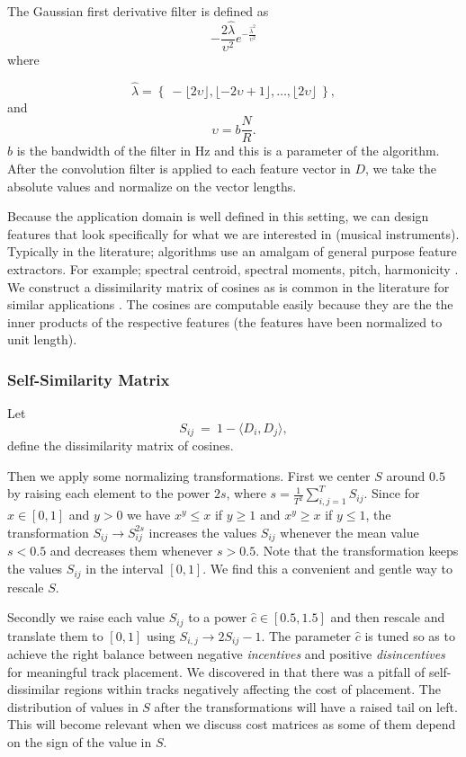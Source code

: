 \documentclass[twocolumn]{article}
\begin{document}
	The Gaussian first derivative filter is defined as 
	$$- \frac{2 \hat{\lambda}}{\upsilon^2}  e^{-\frac{\hat{\lambda}^2}{\upsilon^2}} $$ where 
	
	$$\hat{\lambda}=\left\{~-\lfloor 2\upsilon\rfloor,\lfloor-2\upsilon+1\rfloor,\ldots, \lfloor 2 \upsilon \rfloor~\right\},$$ and $$\upsilon = b  \frac{N}{R} .$$ $b$ is the bandwidth of the filter in Hz and this is a parameter of the algorithm. After the convolution filter is applied to each feature vector in $D$, we take the absolute values and normalize on the vector lengths.  
	
	Because the application domain is well defined in this setting, we can design features that look specifically for what we are interested in (musical instruments). Typically in the literature; algorithms use an amalgam of general purpose feature extractors. For example; spectral centroid, spectral moments, pitch, harmonicity \cite{tzanetakis1999framework}. We construct a dissimilarity matrix of cosines as is common in the literature for similar applications \cite{foote1999visualizing}. The cosines are computable easily because they are the the inner products of the respective features (the features have been normalized to unit length).
	
		\subsubsection{Self-Similarity Matrix}\label{sec:self-similarity}
	
	Let
	\[
	S_{ij} ~=~ 1-\langle D_{i}, D_{j}\rangle,
	\] define the dissimilarity matrix of cosines.
	
Then we apply some normalizing transformations. First we center $S$
around $0.5$ by raising each element to the power $2s$, where
$s=\frac{1}{T^2}\sum_{i,j=1}^TS_{ij}$. Since for $x\in [0,1]$ and
$y>0$ we have $x^y\le x$ if $y\ge 1$ and $x^y\ge x$ if $y\le 1$, the
transformation $S_{ij}\to S_{ij}^{2s}$ increases the values $S_{ij}$
whenever the mean value $s<0.5$ and decreases them whenever
$s>0.5$. Note that the transformation keeps the values $S_{ij}$ in the
interval $[0,1]$. We find this a convenient and gentle way to rescale
$S$.

Secondly we raise each value $S_{ij}$ to a power $\hat c \in
[0.5,1.5]$ and then rescale and translate them to $[0,1]$ using
$S_{i,j}\to 2S_{ij}-1$.  The parameter $\hat c$ is tuned so as to
achieve the right balance between negative \textit{incentives} and
positive \textit{disincentives} for meaningful track placement. We discovered in \citep{scarfe2013long}  that there was a pitfall of self-dissimilar regions within tracks negatively affecting the cost of placement. The distribution of values in $S$ after the transformations will have a
raised tail on left. This will become relevant when we discuss cost
matrices as some of them depend on the sign of the value in $S$.
	
\end{document}
